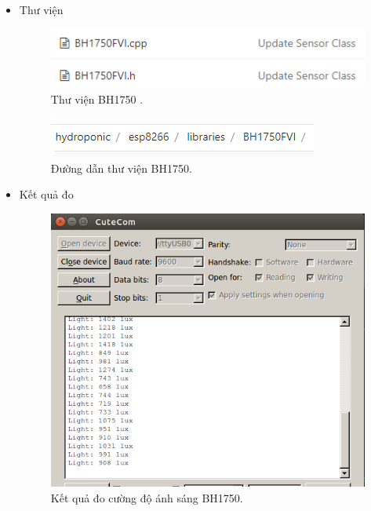 \documentclass[a4paper,12pt,oneside]{article}
\begin{document}
\begin{enumerate}
\begin{itemize}
			\item Thư viện
			
			\begin{figure}[H]
			\centering
			\includegraphics[scale=.7]{hinh/lib_light.PNG}
			\caption{Thư viện BH1750 .}
			\end{figure}
			
			\begin{figure}[H]
			\centering
			\includegraphics[scale=.7]{hinh/path_light.PNG}
			\caption{Đường dẫn thư viện BH1750.}
			\end{figure}
			
			\item Kết quả đo
			
			\begin{figure}[H]
			\centering
			\includegraphics[scale=.6]{hinh/result_light.PNG}
			\caption{Kết quả đo cường độ ánh sáng BH1750.}
			\end{figure}
		
		
		\end{itemize}
		

\end{enumerate}
\end{document}
